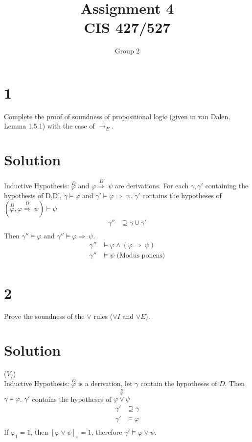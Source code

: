 \documentclass[10pt]{article}
\renewcommand{\implies}{\Rightarrow \ }
\begin{document}
\title{Assignment \raisebox{.22ex}{\large\#}4 \\
	CIS 427/527}
\author{Group 2}

\maketitle

\section*{1}

Complete the proof of soundness of propositional logic (given in van Dalen, Lemma 1.5.1) with the case of $\to _E$.

\section*{Solution}
Inductive Hypothesis: $\overset{D}{\varphi}$ and $\overset{D'}{\varphi \implies \psi}$ are derivations. For each $\gamma , \gamma'$ containing the hypothesis of D,D', $\gamma \models \varphi$ and $\gamma' \models \varphi \implies \psi$.
$\gamma'$ contains the hypotheses of  $(\overset{D}{\varphi}, \overset{D'}{\varphi \implies \psi}) \vdash \psi$
\begin{align*}
\gamma'' &\supseteq \gamma \cup \gamma' \\
\end{align*}
Then $\gamma'' \models \varphi$ and $\gamma'' \models \varphi \implies \psi$.
\begin{align*}
\gamma'' &\models \varphi \land (\varphi \implies \psi) \\ 
\gamma'' &\models \psi \text{ (Modus ponens)} \\
\end{align*}
\section*{2}

Prove the soundness of the $\lor$ rules ($\lor I$ and $\lor E$).

\section*{Solution}

($V_I$) \\
Inductive Hypothesis: $\overset{D}{\varphi}$ is a derivation, let $\gamma$ contain the hypotheses of $D$. Then $\gamma \models \varphi$.
$\gamma'$ contains the hypotheses of  $\overset{\overset{D}{\varphi}}{\varphi \lor \psi} $
\begin{align*}
\gamma' &\supseteq \gamma \\
\gamma' &\models \varphi \\
\end{align*}
If $\varphi_1 = 1$, then $[\varphi \lor \psi]_v = 1$, therefore $\gamma' \models \varphi \lor \psi$. \vspace{20pt}
\end{document}
